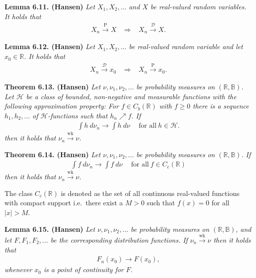 \documentclass[a4paper,12pt,openany]{book}
\begin{document}
\textbf{Lemma 6.11. (Hansen)} \emph{Let \(X_1,X_2,...\) and \(X\) be real-valued random variables. It holds that}
\begin{align*}
    X_n\stackrel{\text{P}}{\to} X\hspace{10pt}\Rightarrow\hspace{10pt} X_n\stackrel{\mathcal{D}}{\to} X.
\end{align*}

\textbf{Lemma 6.12. (Hansen)} \emph{Let \(X_1,X_2,...\) be real-valued random variable and let \(x_0\in\mathbb{R}\). It holds that}
\begin{align*}
    X_n\stackrel{\mathcal{D}}{\to} x_0\hspace{10pt}\Rightarrow\hspace{10pt} X_n\stackrel{\text{P}}{\to} x_0.
\end{align*}

\textbf{Theorem 6.13. (Hansen)} \emph{Let \(\nu,\nu_1,\nu_2,...\) be probability measures on \((\mathbb{R},\mathbb{B})\). Let \(\mathcal{H}\) be a class of bounded, non-negative and measurable functions with the following approximation property: For \(f\in C_b(\mathbb{R})\) with \(f\ge 0\) there is a sequence \(h_1,h_2,...\) of \(\mathcal{H}\)-functions such that \(h_n\nearrow f\). If}
\begin{align*}
    \int h\ d\nu_n\to \int h\ d\nu\hspace{15pt}\text{for all}\ h\in\mathcal{H}.\tag{6.11}
\end{align*}
\emph{then it holds that \(\nu_n\stackrel{\text{wk}}{\to} \nu\).}

\textbf{Theorem 6.14. (Hansen)} \emph{Let \(\nu,\nu_1,\nu_2,...\) be probability measures on \((\mathbb{R},\mathbb{B})\). If}
\begin{align*}
    \int f\ d\nu_n\to \int f\ d\nu\hspace{15pt}\text{for all}\ f\in C_c(\mathbb{R})\tag{6.13}
\end{align*}
\emph{then it holds that \(\nu_n\stackrel{\text{wk}}{\to} \nu\).}

The class \(C_c(\mathbb{R})\) is denoted as the set of all continuous real-valued functions with compact support i.e.~there exist a \(M>0\) such that \(f(x)=0\) for all \(\vert x\vert>M\).

\textbf{Lemma 6.15. (Hansen)} \emph{Let \(\nu,\nu_1,\nu_2,...\) be probability measures on \((\mathbb{R},\mathbb{B})\), and let \(F,F_1,F_2,...\) be the corresponding distribution functions. If \(\nu_n\stackrel{\text{wk}}{\to}\nu\) then it holds that}
\begin{align*}
    F_n(x_0)\to F(x_0),
\end{align*}
\emph{whenever \(x_0\) is a point of continuity for \(F\).}
\end{document}
